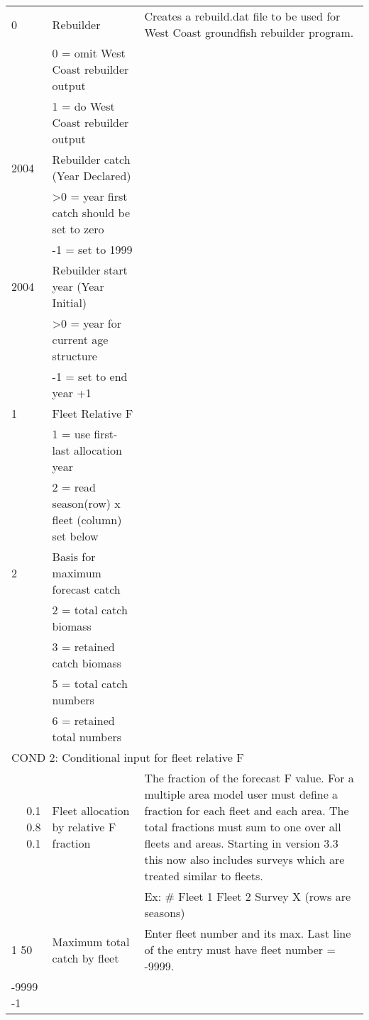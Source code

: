 \begin{landscape}
{\begin{longtable}{p{3.2cm} p{7cm} p{10.8cm}}
 \hline
 0 & Rebuilder &\multirow{1}{1cm}[-0.25cm]{\parbox{11cm}{Creates a rebuild.dat file to be used for West Coast groundfish rebuilder program.}} \Tstrut\\
   & 0 = omit West Coast rebuilder output & \\
   & 1 = do West Coast rebuilder output & \Bstrut\\
   
 \hline
 2004 & Rebuilder catch (Year Declared) & \Tstrut\\
      & >0 = year first catch should be set to zero & \\
      & -1 = set to 1999 & \Bstrut\\
      
 \hline
 2004 & Rebuilder start year (Year Initial) & \Tstrut\\
      & >0 = year for current age structure & \\
      & -1 = set to end year +1 & \Bstrut\\
    
 \hline
 1 & Fleet Relative F & \Tstrut\\
   & 1 = use first-last allocation year & \\
   & 2 = read season(row) x fleet (column) set below & \Bstrut\\

 \hline 
 2 & Basis for maximum forecast catch &  \Tstrut\\
   & 2 = total catch biomass & \\
   & 3 = retained catch biomass & \\
   & 5 = total catch numbers & \\
   & 6 = retained total numbers & \Bstrut\\
    
 \hline 
 \multicolumn{3}{l}{COND 2: Conditional input for fleet relative F} \Tstrut\\
 \multicolumn{1}{r}{0.1 0.8 0.1}  & Fleet allocation by relative F fraction & The fraction of the forecast F value.  For a multiple area model user must define a fraction for each fleet and each area.  The total fractions must sum to one over all fleets and areas.  Starting in version 3.3 this now also includes surveys which are treated similar to fleets.\\
   &  &  Ex: \# Fleet 1  Fleet 2  Survey X (rows are seasons) \Bstrut\\ 

  \hline
  1 50 & Maximum total catch by fleet & \multirow{1}{1cm}[-0.25cm]{\parbox{11cm}{Enter fleet number and its max. Last line of the entry must have fleet number = -9999.}} \Tstrut\\
  -9999 -1 & & \Bstrut\\
  \hline
  

\end{longtable}}
\end{landscape}
